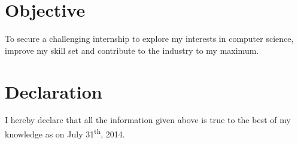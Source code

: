 \documentclass[11pt,a4paper,sans]{moderncv}        %
\begin{document}
 \section{Objective}
To secure a challenging internship to explore my interests in computer science, improve my skill set and contribute to
the industry to my maximum.
\section{Declaration}
I hereby declare that all the information given above is true to the best of my knowledge as on July 31\textsuperscript{th}, 2014.



\section {}

\end{document}
